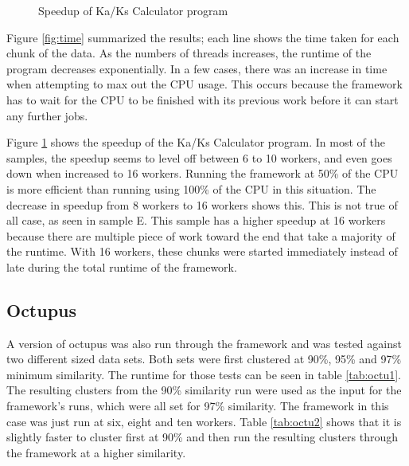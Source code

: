 \documentclass[12pt]{article}
\begin{document}
\begin{figure}
    \begin{center}
    \end{center}
    \caption{Speedup of Ka/Ks Calculator program}
    \label{fig:speedup}
\end{figure}

Figure \ref{fig:time} summarized the results; each line shows the time taken for
each chunk of the data. As the numbers of threads increases, the runtime of the
program decreases exponentially. In a few cases, there was an increase in time
when attempting to max out the CPU usage. This occurs because the framework has
to wait for the CPU to be finished with its previous work before it can start
any further jobs. 

Figure \ref{fig:speedup} shows the speedup of the Ka/Ks Calculator program. 
In most of the samples, the speedup seems to level off between 6 to 10 workers,
and even goes down when increased to 16 workers. Running the framework at 50\% 
of the CPU is more efficient than running using 100\% of the CPU in this 
situation. The decrease in speedup from 8 workers to 16 workers shows this.
This is not true of all case, as seen in sample E. This sample has a higher
speedup at 16 workers because there are multiple piece of work toward the end
that take a majority of the runtime. With 16 workers, these chunks were started
immediately instead of late during the total runtime of the framework.

\subsection{Octupus}

A version of octupus was also run through the framework and was tested against
two different sized data sets. Both sets were first clustered at 90\%, 95\% and
97\% minimum similarity. The runtime for those tests can be seen in table
\ref{tab:octu1}. The resulting clusters from the 90\% similarity run were used as
the input for the framework's runs, which were all set for 97\% similarity. 
The framework in this case was just run at six, eight and ten workers. Table 
\ref{tab:octu2} shows that it is slightly faster to cluster first at 90\% and 
then run the resulting clusters through the framework at a higher similarity. 
\end{document}
